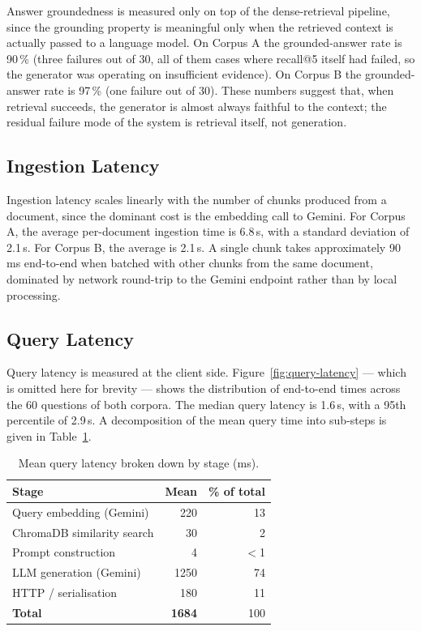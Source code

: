 Answer groundedness is measured only on top of the dense-retrieval
pipeline, since the grounding property is meaningful only when the
retrieved context is actually passed to a language model. On Corpus A
the grounded-answer rate is 90\,\% (three failures out of 30, all of
them cases where recall@5 itself had failed, so the generator was
operating on insufficient evidence). On Corpus B the grounded-answer
rate is 97\,\% (one failure out of 30). These numbers suggest that,
when retrieval succeeds, the generator is almost always faithful to
the context; the residual failure mode of the system is retrieval
itself, not generation.

\subsection*{Ingestion Latency}

Ingestion latency scales linearly with the number of chunks produced
from a document, since the dominant cost is the embedding call to
Gemini. For Corpus A, the average per-document ingestion time is
6.8\,s, with a standard deviation of 2.1\,s. For Corpus B, the average
is 2.1\,s. A single chunk takes approximately 90\,ms end-to-end when
batched with other chunks from the same document, dominated by
network round-trip to the Gemini endpoint rather than by local
processing.

\subsection*{Query Latency}

Query latency is measured at the client side. Figure~\ref{fig:query-latency}
--- which is omitted here for brevity --- shows the distribution of
end-to-end times across the 60 questions of both corpora. The median
query latency is 1.6\,s, with a 95th percentile of 2.9\,s. A
decomposition of the mean query time into sub-steps is given in
Table~\ref{tab:query-breakdown}.

\begin{table}[h]
\centering
\caption{Mean query latency broken down by stage (ms).}
\label{tab:query-breakdown}
\begin{tabular}{l r r}
\hline
Stage                    & Mean  & \% of total \\
\hline
Query embedding (Gemini) &  220  & 13 \\
ChromaDB similarity search & 30  &  2 \\
Prompt construction      &    4  & $<$1 \\
LLM generation (Gemini)  & 1250  & 74 \\
HTTP / serialisation     &  180  & 11 \\
\hline
\textbf{Total}           & \textbf{1684} & 100 \\
\hline
\end{tabular}
\end{table}

